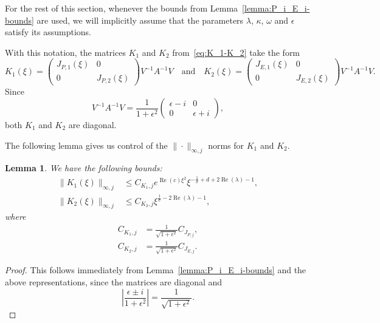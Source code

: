 \documentclass[11pt]{article}
\DeclareMathOperator{\real}{Re}
\newtheorem{lemma}[definition]{Lemma}
\begin{document}
For the rest of this section, whenever the bounds from
Lemma~\ref{lemma:P_i_E_i-bounds} are used, we will implicitly assume
that the parameters \(\lambda\), \(\kappa\), \(\omega\) and
\(\epsilon\) satisfy its assumptions.

With this notation, the matrices \(K_{1}\) and \(K_{2}\)
from~\eqref{eq:K_1-K_2} take the form
\begin{equation*}
  K_{1}(\xi) = \begin{pmatrix} J_{P,1}(\xi) & 0\\ 0 & J_{P,2}(\xi)\end{pmatrix}V^{-1}A^{-1}V
  \quad\text{and}\quad
  K_{2}(\xi) = \begin{pmatrix} J_{E,1}(\xi) & 0\\ 0 & J_{E,2}(\xi)\end{pmatrix}V^{-1}A^{-1}V.
\end{equation*}
Since
\begin{equation*}
  V^{-1}A^{-1}V = \frac{1}{1 + \epsilon^{2}}
  \begin{pmatrix}
    \epsilon - i & 0\\
    0 & \epsilon + i
  \end{pmatrix},
\end{equation*}
both \(K_{1}\) and \(K_{2}\) are diagonal.

The following lemma gives us control of the \(\|\cdot\|_{\infty,j}\)
norms for \(K_{1}\) and \(K_{2}\).

\begin{lemma}\label{lemma:bound-K_1-K_2}
  We have the following bounds:
  \begin{align*}
    \|K_{1}(\xi)\|_{\infty,j} &\leq C_{K_{1},j}e^{\real(c)\xi^{2}}\xi^{-\frac{1}{\sigma} + d + 2\real(\lambda) - 1},\\
    \|K_{2}(\xi)\|_{\infty,j} &\leq C_{K_{2},j}\xi^{\frac{1}{\sigma} - 2\real(\lambda) - 1},
  \end{align*}
  where
  \begin{align*}
    C_{K_{1},j} &= \frac{1}{\sqrt{1 + \epsilon^{2}}}C_{J_{P,j}},\\
    C_{K_{2},j} &= \frac{1}{\sqrt{1 + \epsilon^{2}}}C_{J_{E,j}}.
  \end{align*}
\end{lemma}

\begin{proof}
  This follows immediately from Lemma~\ref{lemma:P_i_E_i-bounds} and
  the above representations, since the matrices are diagonal and
  \begin{equation*}
    \left|\frac{\epsilon \pm i}{1 + \epsilon^{2}}\right| = \frac{1}{\sqrt{1 + \epsilon^{2}}}.
  \end{equation*}
\end{proof}
\end{document}
